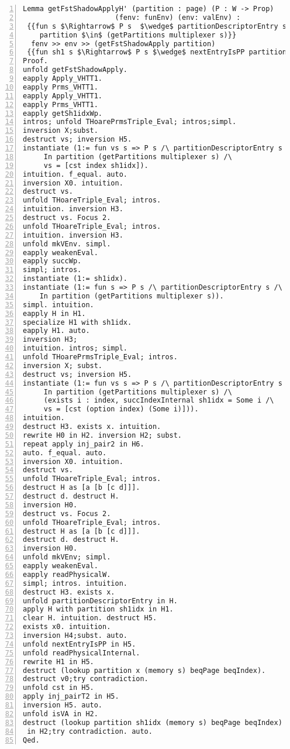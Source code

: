 \begin{appendices}
\begin{lstlisting}[xleftmargin=-.1\textwidth,
xrightmargin=-.1\textwidth,
mathescape=true,numbers=left]
Lemma getFstShadowApplyH' (partition : page) (P : W -> Prop) 
	                  (fenv: funEnv) (env: valEnv) :
 {{fun s $\Rightarrow$ P s  $\wedge$ partitionDescriptorEntry s $\wedge$
 	partition $\in$ (getPartitions multiplexer s)}}
  fenv >> env >> (getFstShadowApply partition) 
 {{fun sh1 s $\Rightarrow$ P s $\wedge$ nextEntryIsPP partition sh1idx sh1 s}}.
Proof.
unfold getFstShadowApply.
eapply Apply_VHTT1.
eapply Prms_VHTT1.
eapply Apply_VHTT1.
eapply Prms_VHTT1.
eapply getSh1idxWp.
intros; unfold THoarePrmsTriple_Eval; intros;simpl.
inversion X;subst.
destruct vs; inversion H5.
instantiate (1:= fun vs s => P s /\ partitionDescriptorEntry s /\
     In partition (getPartitions multiplexer s) /\
     vs = [cst index sh1idx]).
intuition. f_equal. auto.
inversion X0. intuition.
destruct vs.
unfold THoareTriple_Eval; intros.
intuition. inversion H3.
destruct vs. Focus 2.
unfold THoareTriple_Eval; intros.
intuition. inversion H3.
unfold mkVEnv. simpl.
eapply weakenEval.
eapply succWp.
simpl; intros. 
instantiate (1:= sh1idx).
instantiate (1:= fun s => P s /\ partitionDescriptorEntry s /\
    In partition (getPartitions multiplexer s)).
simpl. intuition.
eapply H in H1.
specialize H1 with sh1idx.
eapply H1. auto.
inversion H3; 
intuition. intros; simpl.
unfold THoarePrmsTriple_Eval; intros.
inversion X; subst.
destruct vs; inversion H5.
instantiate (1:= fun vs s => P s /\ partitionDescriptorEntry s /\
     In partition (getPartitions multiplexer s) /\ 
     (exists i : index, succIndexInternal sh1idx = Some i /\ 
     vs = [cst (option index) (Some i)])).
intuition.
destruct H3. exists x. intuition.
rewrite H0 in H2. inversion H2; subst.
repeat apply inj_pair2 in H6.
auto. f_equal. auto.
inversion X0. intuition.
destruct vs.
unfold THoareTriple_Eval; intros.
destruct H as [a [b [c d]]].
destruct d. destruct H.
inversion H0.
destruct vs. Focus 2.
unfold THoareTriple_Eval; intros.
destruct H as [a [b [c d]]].
destruct d. destruct H.
inversion H0.
unfold mkVEnv; simpl.
eapply weakenEval.
eapply readPhysicalW.
simpl; intros. intuition.
destruct H3. exists x.
unfold partitionDescriptorEntry in H.
apply H with partition sh1idx in H1.
clear H. intuition. destruct H5.
exists x0. intuition.
inversion H4;subst. auto.
unfold nextEntryIsPP in H5.
unfold readPhysicalInternal.
rewrite H1 in H5.
destruct (lookup partition x (memory s) beqPage beqIndex).
destruct v0;try contradiction.
unfold cst in H5.
apply inj_pairT2 in H5.
inversion H5. auto.
unfold isVA in H2.
destruct (lookup partition sh1idx (memory s) beqPage beqIndex) 
 in H2;try contradiction. auto.
Qed.
\end{lstlisting} \pagebreak


\end{appendices}
